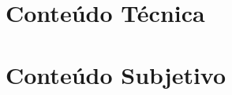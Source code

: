 \documentclass[12pt,a4paper]{report}
\begin{document}
	



\pagestyle{plain}



\tableofcontents
\listoffigures

\newpage


\part{Conteúdo Técnica}











\part{Conteúdo Subjetivo}



%

%


\end{document}
